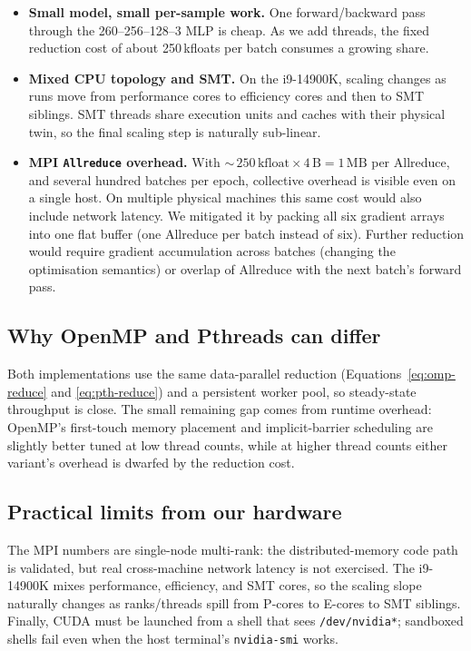 \documentclass[11pt,a4paper]{article}
\begin{document}
\begin{itemize}[noitemsep,topsep=2pt]
  \item \textbf{Small model, small per-sample work.} One forward/backward
  pass through the 260--256--128--3 MLP is cheap. As we add threads, the
  fixed reduction cost of about 250\,kfloats per batch consumes a growing
  share.
  \item \textbf{Mixed CPU topology and SMT.} On the i9-14900K, scaling
  changes as runs move from performance cores to efficiency cores and then
  to SMT siblings. SMT threads share execution units and caches with
  their physical twin, so the final scaling step is naturally sub-linear.
  \item \textbf{MPI \texttt{Allreduce} overhead.} With
  \(\sim\,250\,\mathrm{kfloat}\times4\,\mathrm{B} = 1\,\mathrm{MB}\) per
  Allreduce, and several hundred batches per epoch, collective overhead is
  visible even on a single host. On multiple physical machines this same
  cost would also include network latency. We mitigated it by packing all
  six gradient arrays into one flat buffer (one Allreduce per batch instead
  of six). Further reduction would require gradient accumulation across
  batches (changing the optimisation semantics) or overlap of Allreduce
  with the next batch's forward pass.
\end{itemize}

\subsection{Why OpenMP and Pthreads can differ}

Both implementations use the same data-parallel reduction
(Equations~\eqref{eq:omp-reduce} and \eqref{eq:pth-reduce}) and a
persistent worker pool, so steady-state throughput is close. The small
remaining gap comes from runtime overhead: OpenMP's first-touch memory
placement and implicit-barrier scheduling are slightly better tuned at
low thread counts, while at higher thread counts either variant's
overhead is dwarfed by the reduction cost.

\subsection{Practical limits from our hardware}

The MPI numbers are single-node multi-rank: the distributed-memory code
path is validated, but real cross-machine network latency is not
exercised. The i9-14900K mixes performance, efficiency, and SMT cores,
so the scaling slope naturally changes as ranks/threads spill from
P-cores to E-cores to SMT siblings. Finally, CUDA must be launched from
a shell that sees \verb|/dev/nvidia*|; sandboxed shells fail even when
the host terminal's \verb|nvidia-smi| works.
\end{document}
